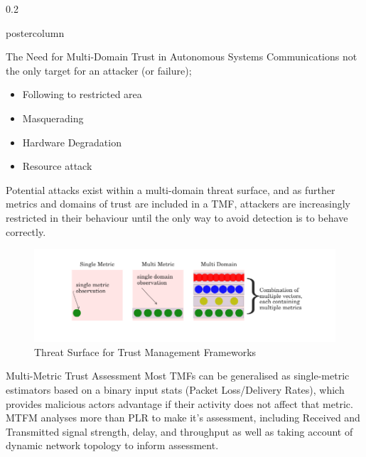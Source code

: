 \documentclass[final,hyperref={pdfpagelabels=false}]{beamer}
\def\colwidth{0.2\linewidth}
\begin{document}
\begin{frame}[fragile]
\begin{columns}[T]
		\begin{column}{\colwidth}
			\begin{beamercolorbox}[center,wd=\textwidth]{postercolumn}
				\begin{minipage}[T]{.98\textwidth} %
					\parbox[t]{\textwidth}{ %
						
						\begin{block}{The Need for Multi-Domain Trust in Autonomous Systems}
							Communications not the only target for an attacker (or failure);
							\begin{itemize}
								\item Following to restricted area
								\item Masquerading
								\item Hardware Degradation
								\item Resource attack
							\end{itemize}
							
							Potential attacks exist within a multi-domain threat surface, and as further metrics and domains of trust are included in a TMF, attackers are increasingly restricted in their behaviour until the only way to avoid detection is to behave correctly.
							\begin{figure}[h]
								\centering
								\includegraphics[width=0.9\linewidth]{threat_surface_sum}
								\caption{Threat Surface for Trust Management Frameworks}
							\end{figure}
						\end{block}
												
												
						\begin{block}{Multi-Metric Trust Assessment}
							Most TMFs can be generalised as single-metric estimators based on a binary input stats (Packet Loss/Delivery Rates), which provides malicious actors advantage if their activity does not affect that metric. MTFM\cite{Guo11} analyses more than PLR to make it's assessment, including Received and Transmitted signal strength, delay, and throughput as well as taking account of dynamic network topology to inform assessment.
							

\end{block}}
\end{minipage}
\end{beamercolorbox}
\end{column}
\end{columns}
\end{frame}
\end{document}
